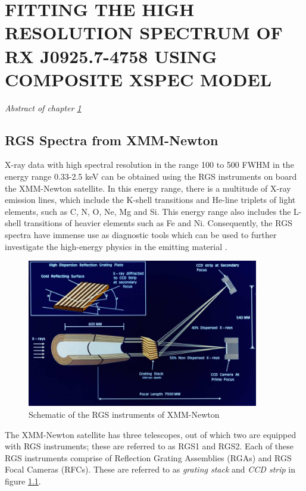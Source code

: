 \chapter{FITTING THE HIGH RESOLUTION SPECTRUM OF RX J0925.7-4758 USING COMPOSITE XSPEC MODEL} \label{chap:hi-resolution}
    \minitoc
    \begin{center}
    	\emph{Abstract of chapter \ref{chap:hi-resolution}}
    \end{center}

	\section{RGS Spectra from XMM-Newton} \label{hi-resolution:rgs-spec}
		X-ray data with high spectral resolution in the range 100 to 500 FWHM in the energy range 0.33-2.5 keV can be obtained using the RGS instruments on board the XMM-Newton satellite. In this energy range, there is a multitude of X-ray emission lines, which include the K-shell transitions and He-line triplets of light elements, such as C, N, O, Ne, Mg and Si. This energy range also includes the L-shell transitions of heavier elements such as Fe and Ni. Consequently, the RGS spectra have immense use as diagnostic tools which can be used to further investigate the high-energy physics in the emitting material \cite{xmmUserHandbook}.
		
		\begin{figure}[h!]
			\centering
			\includegraphics[width=0.9\textwidth]{xmm-rgs.png}
			\caption{Schematic of the RGS instruments of XMM-Newton}
			\label{xmm-rgs-instrument}
		\end{figure}
		
		The XMM-Newton satellite has three telescopes, out of which two are equipped with RGS instruments; these are referred to as RGS1 and RGS2. Each of these RGS instruments comprise of Reflection Grating Assemblies (RGAs) and RGS Focal Cameras (RFCs). These are referred to as \emph{grating stack} and \emph{CCD strip} in figure \ref{xmm-rgs-instrument}.
		
